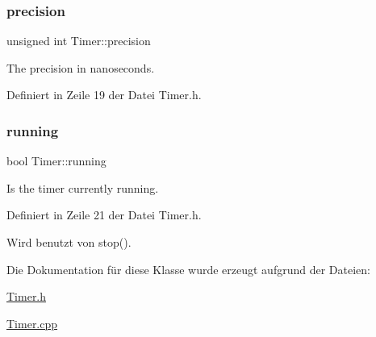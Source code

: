\subsubsection{\texorpdfstring{precision}{precision}}
{\footnotesize\ttfamily unsigned int Timer\+::precision\hspace{0.3cm}{\ttfamily [private]}}



The precision in nanoseconds. 



Definiert in Zeile 19 der Datei Timer.\+h.

\mbox{\label{class_timer_a3b8bb57a0a252c88f85c0592715ea425}} 
\subsubsection{\texorpdfstring{running}{running}}
{\footnotesize\ttfamily bool Timer\+::running\hspace{0.3cm}{\ttfamily [private]}}



Is the timer currently running. 



Definiert in Zeile 21 der Datei Timer.\+h.



Wird benutzt von stop().



Die Dokumentation für diese Klasse wurde erzeugt aufgrund der Dateien\+:\begin{DoxyCompactItemize}
\item 
\hyperlink{_timer_8h}{Timer.\+h}\item 
\hyperlink{_timer_8cpp}{Timer.\+cpp}\end{DoxyCompactItemize}
